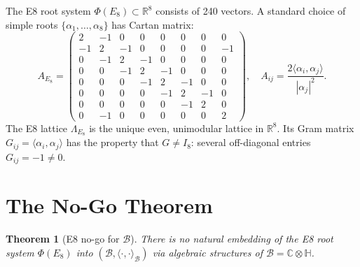 \documentclass[12pt,a4paper]{article}
\newtheorem{theorem}{Theorem}[section]
\theoremstyle{definition}
\theoremstyle{remark}
\begin{document}
The E8 root system $\Phi(E_8) \subset \mathbb{R}^8$ consists of 240 vectors.
A standard choice of simple roots $\{\alpha_1,\ldots,\alpha_8\}$ has Cartan matrix:
\begin{equation}
  A_{E_8}
  = \begin{pmatrix}
      2 & -1 &  0 &  0 &  0 &  0 &  0 &  0 \\
     -1 &  2 & -1 &  0 &  0 &  0 &  0 & -1 \\
      0 & -1 &  2 & -1 &  0 &  0 &  0 &  0 \\
      0 &  0 & -1 &  2 & -1 &  0 &  0 &  0 \\
      0 &  0 &  0 & -1 &  2 & -1 &  0 &  0 \\
      0 &  0 &  0 &  0 & -1 &  2 & -1 &  0 \\
      0 &  0 &  0 &  0 &  0 & -1 &  2 &  0 \\
      0 & -1 &  0 &  0 &  0 &  0 &  0 &  2
    \end{pmatrix},
  \quad
  A_{ij} = \frac{2\langle\alpha_i,\alpha_j\rangle}{|\alpha_j|^2}.
  \label{eq:e8:cartan}
\end{equation}
The E8 lattice $\Lambda_{E_8}$ is the unique even, unimodular lattice in $\mathbb{R}^8$.
Its Gram matrix $G_{ij} = \langle\alpha_i,\alpha_j\rangle$ has the property that
$G \neq I_8$: several off-diagonal entries $G_{ij} = -1 \neq 0$.

\section{The No-Go Theorem}
\label{sec:e8:theorem}

\begin{theorem}[E8 no-go for $\mathcal{B}$]
\label{thm:e8:no_go}
There is no natural embedding of the E8 root system $\Phi(E_8)$ into
$(\mathcal{B}, \langle\cdot,\cdot\rangle_{\mathcal{B}})$ via algebraic structures
of $\mathcal{B} = \mathbb{C}\otimes\mathbb{H}$.
\end{theorem}
\end{document}
